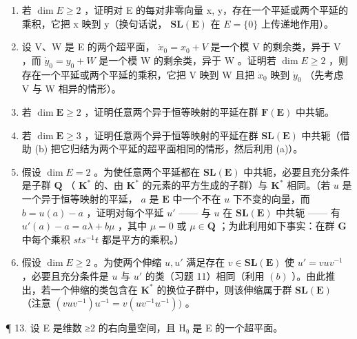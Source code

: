 \begin{enumerate}
\def\labelenumi{(\alph{enumi})}
\item
  若 \(\dim E \geqslant 2\) ，证明对 E 的每对非零向量 x, y，存在一个平延或两个平延的乘积，它把 x 映到 y（换句话说， \(\mathbf{SL}(\mathbf{E})\) 在 \(E = \{0\}\) 上传递地作用）。
\item
  设 V、W 是 E 的两个超平面， \(\dot{x}_{0} = x_{0} + V\) 是一个模 V 的剩余类，异于 V ，而 \(\dot{y}_{0} = y_{0} + W\) 是一个模 W 的剩余类，异于 W 。证明若 \(\dim E \geqslant 2\) ，则存在一个平延或两个平延的乘积，它把 V 映到 W 且把 \(\dot{x}_{0}\) 映到 \(\dot{y}_{0}\) （先考虑 V 与 W 相异的情形）。
\item
  若 \(\dim \mathbf{E} \geqslant 2\) ，证明任意两个异于恒等映射的平延在群 \(\mathbf{F}(\mathbf{E})\) 中共轭。
\item
  若 \(\dim \mathbf{E} \geqslant 3\) ，证明任意两个异于恒等映射的平延在群 \(\mathbf{SL}(\mathbf{E})\) 中共轭（借助 (b) 把它归结为两个平延的超平面相同的情形，然后利用 (a)）。
\item
  假设 \(\dim E = 2\) 。为使任意两个平延都在 \(\mathbf{SL}(\mathbf{E})\) 中共轭，必要且充分条件是子群 \(\mathbf{Q}\) （ \(\mathbf{K}^*\) 的、由 \(\mathbf{K}^*\) 的元素的平方生成的子群）与 \(\mathbf{K}^*\) 相同。（若 \(u\) 是一个异于恒等映射的平延， \(a\) 是 \(\mathbf{E}\) 中一个不在 \(u\) 下不变的向量，而 \(b = u(a) - a\) ，证明对每个平延 \(u'\) —— 与 \(u\) 在 \(\mathbf{SL}(\mathbf{E})\) 中共轭 —— 有 \(u'(a) - a = a\lambda + b\mu\) ，其中 \(\mu = 0\) 或 \(\mu \in \mathbf{Q}\) ；为此利用如下事实：在群 \(\mathbf{G}\) 中每个乘积 \(sts^{-1}t\) 都是平方的乘积。）
\item
  假设 \(\dim E \geqslant 2\) 。为使两个伸缩 \(u, u'\) 满足存在 \(v \in \mathbf{SL}(\mathbf{E})\) 使 \(u' = vuv^{-1}\) ，必要且充分条件是 \(u\) 与 \(u'\) 的类（习题 11）相同（利用 \((b)\) ）。由此推出，若一个伸缩的类包含在 \(\mathbf{K}^*\) 的换位子群中，则该伸缩属于群 \(\mathbf{SL}(\mathbf{E})\) （注意 \((vuv^{-1})u^{-1} = v(uv^{-1}u^{-1}))\) 。
\end{enumerate}

¶ 13. 设 E 是维数 ≥2 的右向量空间，且 H₀ 是 E 的一个超平面。

